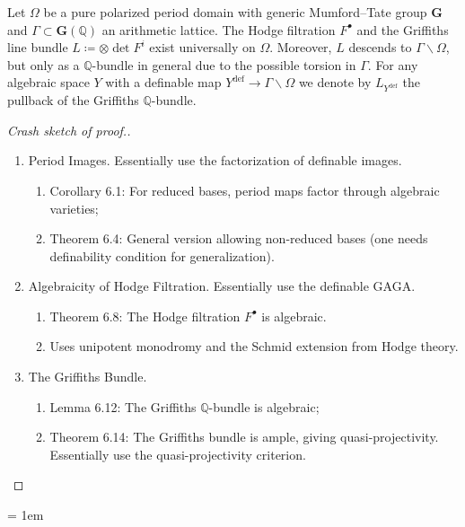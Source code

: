 \documentclass{amsart}
\theoremstyle{definition}
\numberwithin{equation}{section}
\newcommand{\definable}{\mathrm{def}}
\begin{document}
Let $\Omega$ be a pure polarized period domain with generic Mumford--Tate group $\mathbf{G}$
and $\Gamma \subset \mathbf{G}(\mathbb{Q})$ an arithmetic lattice.
The Hodge filtration $F^{\bullet}$ and the Griffiths line bundle $L \coloneq \otimes \det F^i$
exist universally on $\Omega$.
Moreover, $L$ descends to $\Gamma \backslash \Omega$, but only as a $\mathbb{Q}$-bundle in general
due to the possible torsion in $\Gamma$.
For any algebraic space $Y$ with a definable map $Y^\definable \to \Gamma \backslash \Omega$
we denote by $L_{Y^\definable}$ the pullback of the Griffiths $\mathbb{Q}$-bundle.

\begin{proof}[Crash sketch of proof.]~
\begin{enumerate}
	\item Period Images. Essentially use the factorization of definable images.
	\begin{enumerate}
		\item Corollary 6.1: For reduced bases, period maps factor through algebraic varieties;
		\item Theorem 6.4: General version allowing non-reduced bases (one needs definability condition for generalization).
	\end{enumerate}
	\item Algebraicity of Hodge Filtration. Essentially use the definable GAGA.
	\begin{enumerate}
		\item Theorem 6.8: The Hodge filtration $F^{\bullet}$ is algebraic.
		\item Uses unipotent monodromy and the Schmid extension from Hodge theory.
	\end{enumerate}
	\item The Griffiths Bundle.
	\begin{enumerate}
		\item Lemma 6.12: The Griffiths $\mathbb{Q}$-bundle is algebraic;
		\item Theorem 6.14: The Griffiths bundle is ample, giving quasi-projectivity. Essentially use the quasi-projectivity criterion.
	\end{enumerate}
\end{enumerate}
\end{proof}


\emergencystretch = 1em
\printbibliography
\end{document}
